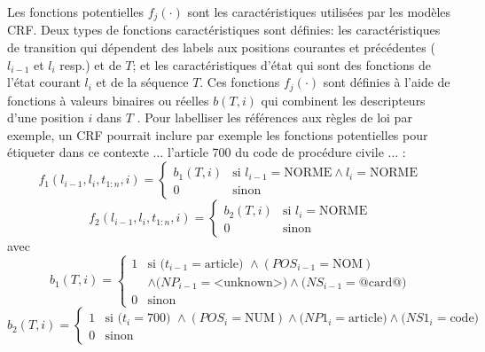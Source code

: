  Les fonctions potentielles $f_j(\cdot)$ sont les caractéristiques utilisées par les modèles CRF. Deux types de fonctions caractéristiques sont définies: les caractéristiques de transition qui dépendent des labels aux positions courantes et précédentes ($l_{i-1}$ et $ l_{i}$ resp.) et de $T$; et les caractéristiques d'état qui sont des fonctions de l'état courant $ l_{i} $ et de la séquence $ T $. Ces fonctions $f_j(\cdot)$ sont définies à l'aide de fonctions à valeurs binaires ou réelles $b(T,i)$ qui combinent les descripteurs d'une position $i$ dans $T$ \citep{Wallach2004crfintro}. Pour labelliser les références aux règles de loi par exemple, un CRF pourrait inclure par exemple les fonctions potentielles pour étiqueter   \fg{} dans ce contexte \og ... l'article 700 du code de procédure civile ... \fg{}:
{\small
\[f_1(l_{i-1},l_i,t_{1:n},i) = \left\lbrace \begin{array}{ll}
b_1(T,i) & \text{si } l_{i-1} = \text{NORME} \wedge l_i = \text{NORME} \\
0 & \text{sinon}
\end{array} \right.\]
\[f_2(l_{i-1},l_i,t_{1:n},i) = \left\lbrace \begin{array}{ll}
b_2(T,i) & \text{si }l_i = \text{NORME} \\
0 & \text{sinon}
\end{array} \right.\]
avec
\[b_1(T,i) = \left\lbrace \begin{array}{ll}
1 & \text{si } (t_{i-1} =\text{article) }\wedge (POS_{i-1}=\text{NOM}) \\&  \wedge  (NP_{i-1}=\text{<unknown>)} \wedge (NS_{i-1}=\text{@card@)} \\
0 & \text{sinon} 
\end{array} \right.\]
\[b_2(T,i) = \left\lbrace \begin{array}{ll}
1 & \text{si } (t_i =\text{700) }\wedge (POS_i=\text{NUM})  \wedge (NP1_i=\text{article)} 
\wedge (NS1_i=\text{code)} \\
0 & \text{sinon}
\end{array} \right.\]
}
